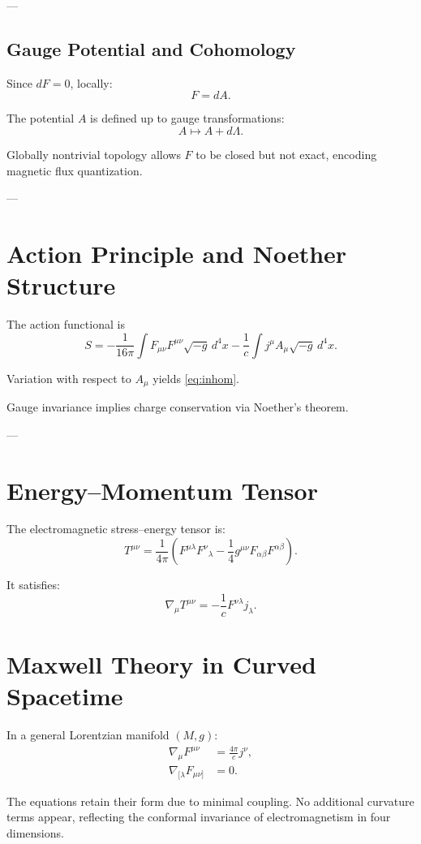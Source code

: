 \documentclass[12pt]{article}
\begin{document}
---

\subsection{Gauge Potential and Cohomology}

Since $dF = 0$, locally:
\[
F = dA.
\]

The potential $A$ is defined up to gauge transformations:
\[
A \mapsto A + d\Lambda.
\]

Globally nontrivial topology allows $F$ to be closed but not exact, encoding magnetic flux quantization.

---

\section{Action Principle and Noether Structure}

The action functional is
\[
S = -\frac{1}{16\pi} \int F_{\mu\nu}F^{\mu\nu}\sqrt{-g}\, d^4x
- \frac{1}{c}\int j^\mu A_\mu \sqrt{-g}\, d^4x.
  \]

Variation with respect to $A_\mu$ yields \eqref{eq:inhom}.

Gauge invariance implies charge conservation via Noether’s theorem.

---

\section{Energy--Momentum Tensor}

The electromagnetic stress–energy tensor is:
\[
T^{\mu\nu}
= \frac{1}{4\pi}
\left(
F^{\mu\lambda}F^\nu{}_{\lambda}
- \frac{1}{4} g^{\mu\nu} F_{\alpha\beta}F^{\alpha\beta}
  \right).
  \]

It satisfies:
\[
\nabla_\mu T^{\mu\nu} = -\frac{1}{c} F^{\nu\lambda} j_\lambda.
\]


\section{Maxwell Theory in Curved Spacetime}

In a general Lorentzian manifold $(M,g)$:
\begin{align}
\nabla_\mu F^{\mu\nu} &= \frac{4\pi}{c} j^\nu, \\
\nabla_{[\lambda} F_{\mu\nu]} &= 0.
\end{align}

The equations retain their form due to minimal coupling. No additional curvature terms appear, reflecting the conformal invariance of electromagnetism in four dimensions.
\end{document}
